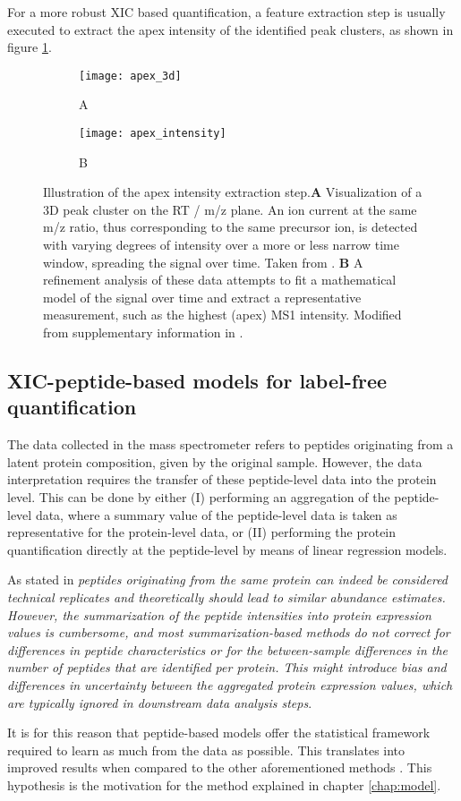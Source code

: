 \documentclass[thesis]{subfiles}
\begin{document}
For a more robust XIC based quantification, a feature extraction step is usually executed to extract the apex intensity of the identified peak clusters, as shown in figure \ref{figure:moff_apex}.

\begin{figure}[!h]
\centering
\begin{subfigure}{1\textwidth}
\centering
\caption*{A}
\texttt{[image: apex\_3d]}
\end{subfigure}
\bigskip
\begin{subfigure}{1\textwidth}
\centering
\caption*{B}
\texttt{[image: apex\_intensity]}
\end{subfigure}
\caption{Illustration of the apex intensity extraction step.\textbf{A} Visualization of a 3D peak cluster on the RT / m/z plane. An ion current at the same m/z ratio, thus corresponding to the same precursor ion, is detected with varying degrees of intensity over a more or less narrow time window, spreading the signal over time. Taken from \cite{Smith2014}. \textbf{B} A refinement analysis of these data attempts to fit a mathematical model of the signal over time and extract a representative measurement, such as the highest (apex) \ac{MS1} intensity. Modified from supplementary information in \cite{Argentini2016}.}
\label{figure:moff_apex}
\end{figure}


\subsection{\ac{XIC}-peptide-based models for label-free quantification}
\label{subsec:peptide_model}

The data collected in the mass spectrometer refers to peptides originating from a latent protein composition, given by the original sample. However, the data interpretation requires the transfer of these peptide-level data into the protein level. This can be done by either (I) performing an aggregation of the peptide-level data, where a summary value of the peptide-level data is taken as representative for the protein-level data, or (II) performing the protein quantification directly at the peptide-level by means of linear regression models.

As stated in \cite{Goeminne2015} \textit{peptides originating from the same protein can indeed be considered technical replicates and theoretically should lead to similar abundance estimates. However, the summarization of the peptide intensities into protein expression values is cumbersome, and most summarization-based methods do not correct for differences in peptide characteristics or for the between-sample differences in the number of peptides that are identified per protein. This might introduce bias and differences in uncertainty between the aggregated protein expression values, which are typically ignored in downstream data analysis steps}.

It is for this reason that peptide-based models offer the statistical framework required to learn as much from the data as possible. This translates into improved results when compared to the other aforementioned methods \cite{Goeminne2015}. This hypothesis is the motivation for the method explained in chapter \ref{chap:model}.
\end{document}
